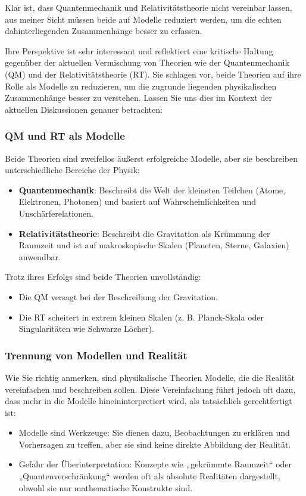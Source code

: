 \documentclass[a4paper,12pt]{article}
\begin{document}
	Klar ist, dass Quantenmechanik und Relativitätstheorie nicht vereinbar lassen, aus meiner Sicht müssen beide auf Modelle reduziert werden, um die echten dahinterliegenden Zusammenhänge besser zu erfassen.
	
	Ihre Perspektive ist sehr interessant und reflektiert eine kritische Haltung gegenüber der aktuellen Vermischung von Theorien wie der Quantenmechanik (QM) und der Relativitätstheorie (RT). Sie schlagen vor, beide Theorien auf ihre Rolle als Modelle zu reduzieren, um die zugrunde liegenden physikalischen Zusammenhänge besser zu verstehen. Lassen Sie uns dies im Kontext der aktuellen Diskussionen genauer betrachten:
	
	\subsubsection{QM und RT als Modelle}
	Beide Theorien sind zweifellos äußerst erfolgreiche Modelle, aber sie beschreiben unterschiedliche Bereiche der Physik:
	\begin{itemize}
		\item \textbf{Quantenmechanik}: Beschreibt die Welt der kleinsten Teilchen (Atome, Elektronen, Photonen) und basiert auf Wahrscheinlichkeiten und Unschärferelationen.
		\item \textbf{Relativitätstheorie}: Beschreibt die Gravitation als Krümmung der Raumzeit und ist auf makroskopische Skalen (Planeten, Sterne, Galaxien) anwendbar.
	\end{itemize}
	
	Trotz ihres Erfolgs sind beide Theorien unvollständig:
	\begin{itemize}
		\item Die QM versagt bei der Beschreibung der Gravitation.
		\item Die RT scheitert in extrem kleinen Skalen (z. B. Planck-Skala oder Singularitäten wie Schwarze Löcher).
	\end{itemize}
	
	\subsubsection{Trennung von Modellen und Realität}
	Wie Sie richtig anmerken, sind physikalische Theorien Modelle, die die Realität vereinfachen und beschreiben sollen. Diese Vereinfachung führt jedoch oft dazu, dass mehr in die Modelle hineininterpretiert wird, als tatsächlich gerechtfertigt ist:
	\begin{itemize}
		\item Modelle sind Werkzeuge: Sie dienen dazu, Beobachtungen zu erklären und Vorhersagen zu treffen, aber sie sind keine direkte Abbildung der Realität.
		\item Gefahr der Überinterpretation: Konzepte wie „gekrümmte Raumzeit“ oder „Quantenverschränkung“ werden oft als absolute Realitäten dargestellt, obwohl sie nur mathematische Konstrukte sind.
	\end{itemize}
	
\end{document}
